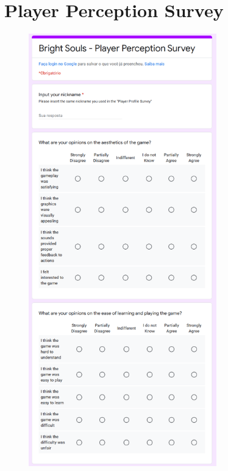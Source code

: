 \chapter{Player Perception Survey}
\label{anx:player-perception-survey}

\begin{figure}[!ht]
    \begin{center}
        \includegraphics[width=22em]{figures/fig-player-perception-survey-pt1.png}
    \end{center}
\end{figure}


